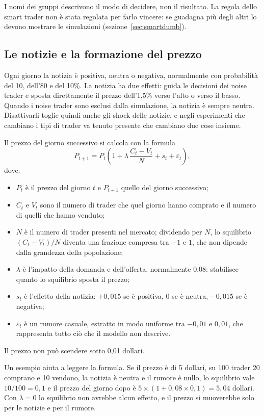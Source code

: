I nomi dei gruppi descrivono il modo di decidere, non il risultato. La regola dello smart trader non è stata regolata per farlo vincere: se guadagna più degli altri lo devono mostrare le simulazioni (sezione~\ref{sec:smartdumb}).

\subsection{Le notizie e la formazione del prezzo}

Ogni giorno la notizia è positiva, neutra o negativa, normalmente con probabilità del 10, dell'80 e del 10\%. La notizia ha due effetti: guida le decisioni dei noise trader e sposta direttamente il prezzo dell'1,5\% verso l'alto o verso il basso. Quando i noise trader sono esclusi dalla simulazione, la notizia è sempre neutra. Disattivarli toglie quindi anche gli shock delle notizie, e negli esperimenti che cambiano i tipi di trader va tenuto presente che cambiano due cose insieme.

Il prezzo del giorno successivo si calcola con la formula
\[
  P_{t+1} = P_t \left( 1 + \lambda\,\frac{C_t - V_t}{N} + s_t + \varepsilon_t \right),
\]
dove:
\begin{itemize}
  \item $P_t$ è il prezzo del giorno $t$ e $P_{t+1}$ quello del giorno successivo;
  \item $C_t$ e $V_t$ sono il numero di trader che quel giorno hanno comprato e il numero di quelli che hanno venduto;
  \item $N$ è il numero di trader presenti nel mercato; dividendo per $N$, lo squilibrio $(C_t - V_t)/N$ diventa una frazione compresa tra $-1$ e $1$, che non dipende dalla grandezza della popolazione;
  \item $\lambda$ è l'impatto della domanda e dell'offerta, normalmente 0,08: stabilisce quanto lo squilibrio sposta il prezzo;
  \item $s_t$ è l'effetto della notizia: $+0{,}015$ se è positiva, $0$ se è neutra, $-0{,}015$ se è negativa;
  \item $\varepsilon_t$ è un rumore casuale, estratto in modo uniforme tra $-0{,}01$ e $0{,}01$, che rappresenta tutto ciò che il modello non descrive.
\end{itemize}
Il prezzo non può scendere sotto 0,01 dollari.

Un esempio aiuta a leggere la formula. Se il prezzo è di 5 dollari, su 100 trader 20 comprano e 10 vendono, la notizia è neutra e il rumore è nullo, lo squilibrio vale $10/100 = 0{,}1$ e il prezzo del giorno dopo è $5 \times (1 + 0{,}08 \times 0{,}1) = 5{,}04$ dollari. Con $\lambda = 0$ lo squilibrio non avrebbe alcun effetto, e il prezzo si muoverebbe solo per le notizie e per il rumore.

